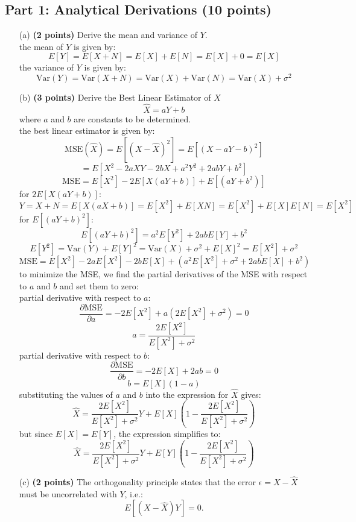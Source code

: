 \documentclass{article}
\begin{document}
\subsection*{Part 1: Analytical Derivations (10 points)}
\begin{enumerate}
    \item[(a)] \textbf{(2 points)} Derive the mean and variance of \(Y\).
    \\ the mean of \(Y\) is given by:
    \[
    E[Y] = E[X + N] = E[X] + E[N] = E[X] + 0 = E[X]
    \]
    the variance of \(Y\) is given by:
    \[
    \text{Var}(Y) = \text{Var}(X + N) = \text{Var}(X) + \text{Var}(N) = \text{Var}(X) + \sigma^2
    \]

    \item[(b)] \textbf{(3 points)} Derive the Best Linear Estimator of \( X \)
    \[
    \hat{X} = aY + b
    \]
    where \( a \) and \( b \) are constants to be determined.
    \\ the best linear estimator is given by:
    \[
    \text{MSE}(\hat{X}) = E[(X - \hat{X})^2] = E[(X - aY - b)^2] 
    \] 
    \[
    = E[X^2 - 2aXY - 2bX + a^2Y^2 + 2abY + b^2]
    \]
    \[
    \text{MSE} = E[X^2] - 2E[X(aY + b)] + E[(aY + b^2)]
    \]
    for $2E[X(aY + b)]$:
    \[
    Y = X + N  = E[X(aX + b)] = E[X^2] + E[XN] = E[X^2] + E[X]E[N] = E[X^2]
    \]
    for $E[(aY + b)^2]$:
    \[
    E[(aY + b)^2] = a^2E[Y^2] + 2abE[Y] + b^2
    \]
    \[
    E[Y^2] = \text{Var}(Y) + E[Y]^2 = \text{Var}(X) + \sigma^2 + E[X]^2 = E[X^2] + \sigma^2
    \]
    \[
    \text{MSE} = E[X^2] - 2aE[X^2] - 2bE[X] + (a^2E[X^2] + \sigma^2 + 2abE[X] + b^2)
    \]
    to minimize the MSE, we find the partial derivatives of the MSE with respect to \( a \) and \( b \) and set them to zero:
    \\ partial derivative with respect to \( a \):
    \[
    \frac{\partial \text{MSE}}{\partial a} = -2E[X^2] + a(2E[X^2] + \sigma^2) = 0
    \]
    \[
    a = \frac{2E[X^2]}{E[X^2] + \sigma^2}
    \]
    partial derivative with respect to \( b \):
    \[
    \frac{\partial \text{MSE}}{\partial b} = -2E[X] + 2ab = 0
    \]
    \[
    b = E[X](1 - a)
    \]
    substituting the values of \( a \) and \( b \) into the expression for \( \hat{X} \) gives:
    \[
    \hat{X} = \frac{2E[X^2]}{E[X^2] + \sigma^2}Y + E[X](1 - \frac{2E[X^2]}{E[X^2] + \sigma^2})
    \]
    but since \( E[X] = E[Y] \), the expression simplifies to:
    \[
    \hat{X} = \frac{2E[X^2]}{E[X^2] + \sigma^2}Y + E[Y](1 - \frac{2E[X^2]}{E[X^2] + \sigma^2})
    \]
    \item[(c)] \textbf{(2 points)} The orthogonality principle states that the error \( \epsilon = X - \hat{X} \) must be uncorrelated with \( Y \), i.e.:
    \[
    E[(X - \hat{X})Y] = 0.
    \]
    

\end{enumerate}
\end{document}
